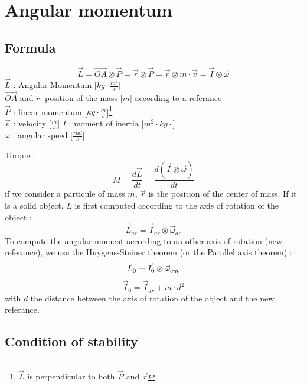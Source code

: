 \documentclass[12pt,a4paper]{article}
\begin{document}
	
	\newpage
	\section{Angular momentum}
	
	\subsection{Formula}
	\begin{equation}
		\vec{L}=\vec{OA} \otimes \vec{P}=\vec{r} \otimes \vec{P}=\vec{r} \otimes m \cdot \vec{v}=\vec{I} \otimes \vec{\omega}
	\end{equation}
	$\vec{L}$ : Angular Momentum [$kg \cdot \frac{m^2}{s}$]\\
	$\vec{OA}$ and $r$: position of the mass [$m$] according to a referance\\
	$\vec{P}$ : linear momentum [$kg\cdot \frac{m}{s}$]\footnote{$\vec{L}$ is perpendicular to both $\vec{P}$ and $\vec{r}$}\\
	$\vec{v}$ : velocity [$\frac{m}{s}$]
	$I$ : moment of inertia [$m^2 \cdot kg \cdot$]\\
	$\omega$ : angular speed [$\frac{rad}{s}$]
	
	Torque : 
	\begin{equation}
		M = \frac{d\vec{L}}{dt}=\frac{d(\vec{I} \otimes \vec{\omega})}{dt}
	\end{equation}
	\medbreak
	if we consider a particule of mass $m$, $\vec{r}$ is the position of the center of mass.
	If it is a solid object, $L$ is first computed according to the axis of rotation of the object : 
	\begin{equation}
		\vec{L}_{ar}=\vec{I}_{ar} \otimes \vec{\omega}_{ar}
	\end{equation}
	To compute the angular moment according to an other axis of rotation (new referance), we use the Huygens-Steiner theorem (or the Parallel axis theorem) : 
	\begin{equation}
		\vec{L}_{0}=\vec{I}_{0} \otimes \vec{\omega}_{cm}\\
	\end{equation}
	\begin{equation}
		\vec{I}_{0} = \vec{I}_{ar} + m\cdot d^2
	\end{equation}
	with $d$ the distance between the axis of rotation of the object and the new referance. 
	\subsection{Condition of stability}
	
\end{document}
